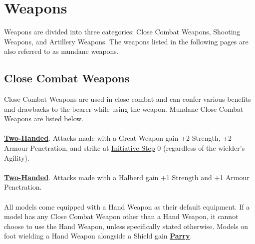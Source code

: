\section{Weapons}
\label{weapons}

Weapons are divided into three categories: Close Combat Weapons, Shooting Weapons, and Artillery Weapons. The weapons listed in the following pages are also referred to as mundane weapons.

\subsection{Close Combat Weapons}
\label{close_combat_weapons}

Close Combat Weapons are used in close combat and can confer various benefits and drawbacks to the bearer while using the weapon. Mundane Close Combat Weapons are listed below.

\paragraph{\gw}
\idx[main=y]{\gw}

\hyperref[twohanded]{\textbf{Two-Handed}}. Attacks made with a Great Weapon gain +2 Strength, +2 Armour Penetration, and  strike at \hyperref[initiative_order]{Initiative Step} 0 (regardless of the wielder's Agility).

\paragraph{\halberd}
\idx[main=y]{\halberd}

\hyperref[twohanded]{\textbf{Two-Handed}}. Attacks made with a Halberd gain +1 Strength and +1 Armour Penetration.

\paragraph{\hw}
\idx[main=y]{\hw}

All models come equipped with a Hand Weapon as their default equipment. If a model has any Close Combat Weapon other than a Hand Weapon, it cannot choose to use the Hand Weapon, unless specifically stated otherwise. Models on foot wielding a Hand Weapon alongside a Shield gain \hyperref[parry]{\textbf{Parry}}.

\paragraph{\lance}
\idx[main=y]{\lance}

